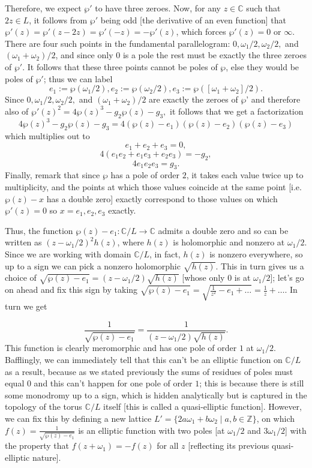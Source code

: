 Therefore, we expect $\wp'$ to have three zeroes. Now, for any $z \in \mathbb{C}$ such that $2z \in L$, it follows from $\wp'$ being odd [the derivative of an even function] that $\wp'(z) = \wp'(z - 2z) =\wp'(-z) = - \wp'(z) $, which forces $\wp'(z) = 0$ or $\infty$. There are four such points in the fundamental parallelogram: $0, \omega_1/2, \omega_2/2, $ and $(\omega_1 + \omega_2)/2$, and since only $0$ is a pole the rest must be exactly the three zeroes of $\wp'$.  It follows that these three points cannot be poles of $\wp$, else they would be poles of $\wp'$; thus we can label
\[e_1 := \wp(\omega_1/2), e_2:=\wp(\omega_2/2), e_3 := \wp([\omega_1 + \omega_2]/2).\]
Since $0, \omega_1/2, \omega_2/2, $ and $(\omega_1 + \omega_2)/2$ are exactly the zeroes of $\wp$' and therefore also of $\wp' (z)^2 = 4 \wp(z)^3 - g_2 \wp(z)- g_3,$ it follows that we get a factorization
\[4 \wp(z)^3 - g_2 \wp(z)- g_3 = 4(\wp(z) - e_1) (\wp(z)  - e_2) (\wp(z) - e_3)\]
which multiplies out to
\[e_1 + e_2 + e_3 = 0,\]
\[4(e_1 e_2 + e_1 e_3 + e_2 e_3) = - g_2,\]
\[ 4 e_1 e_2 e_3 = g_3 .\]
Finally, remark that since $\wp$ has a pole of order $2$, it takes each value twice up to multiplicity, and the points at which those values coincide at the same point [i.e. $\wp(z) - x$ has a double zero] exactly correspond to those values on which $\wp'(z) = 0$ so $x = e_1, e_2, e_3$ exactly. 

Thus, the function $\wp(z) - e_1: \mathbb{C}/L \to \mathbb{C}$ admits a double zero and so can be written as $(z - \omega_1/2)^2 h(z)$, where $h(z)$ is holomorphic and nonzero at $\omega_1/2$. Since we are working with domain $\mathbb{C}/L$, in fact, $h(z)$ is nonzero everywhere, so up to a sign we can pick a nonzero holomorphic $\sqrt{h(z)}$. This in turn gives us a choice of $\sqrt{\wp(z) - e_1} = (z - \omega_1/2)  \sqrt{h(z)}$ [whose only $0$ is at $\omega_1/2$]; let's go on ahead and fix this sign by taking $\sqrt{\wp(z) - e_1} = \sqrt{\frac{1}{z^2} - e_1 + \dots} = \frac{1}{z} + \dots$. In turn we get

\[\frac{1}{\sqrt{\wp(z) - e_1}} = \frac{1}{(z - \omega_1 / 2) \sqrt{h(z)}}.\]
This function is clearly meromorphic and has one pole of order $1$ at $\omega_1/2$. Bafflingly, we can immediately tell that this can't be an elliptic function on $\mathbb{C}/L$ as a result, because as we stated previously the sums of residues of poles must equal $0$ and this can't happen for one pole of order $1$; this is because there is still some monodromy up to a sign, which is hidden analytically but is captured in the topology of the torus $\mathbb{C} / L$ itself [this is called a quasi-elliptic function]. However, we can fix this by defining a new lattice $L' = \{2a \omega_1 +  b \omega_2 \mid a, b \in \mathbb{Z} \}$, on which $f(z) = \frac{1}{\sqrt{\wp(z) - e_1}}$ is an elliptic function with two poles [at $\omega_1/2$ and $3\omega_1/2$] with the property that $f(z + \omega_1) = -f(z)$ for all $z$ [reflecting its previous quasi-elliptic nature]. 

